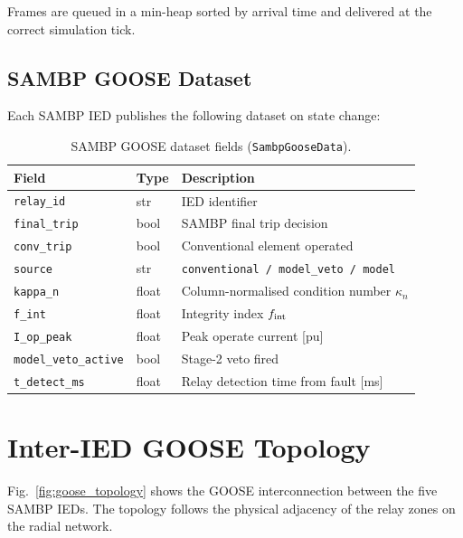 \documentclass[12pt,a4paper]{article}
\newcommand{\kn}{\kappa_n}
\newcommand{\fint}{f_{\rm int}}
\begin{document}
Frames are queued in a min-heap sorted by arrival time and delivered
at the correct simulation tick.

\subsection{SAMBP GOOSE Dataset}

Each SAMBP IED publishes the following dataset on state change:

\begin{table}[H]
  \centering
  \caption{SAMBP GOOSE dataset fields (\texttt{SambpGooseData}).}
  \label{tab:goose_dataset}
  \begin{tabular}{lll}
    \toprule
    Field & Type & Description \\
    \midrule
    \texttt{relay\_id}          & str   & IED identifier \\
    \texttt{final\_trip}        & bool  & SAMBP final trip decision \\
    \texttt{conv\_trip}         & bool  & Conventional element operated \\
    \texttt{source}             & str   & \texttt{conventional / model\_veto / model} \\
    \texttt{kappa\_n}           & float & Column-normalised condition number $\kn$ \\
    \texttt{f\_int}             & float & Integrity index $\fint$ \\
    \texttt{I\_op\_peak}        & float & Peak operate current [pu] \\
    \texttt{model\_veto\_active}& bool  & Stage-2 veto fired \\
    \texttt{t\_detect\_ms}      & float & Relay detection time from fault [ms] \\
    \bottomrule
  \end{tabular}
\end{table}

\section{Inter-IED GOOSE Topology}

Fig.~\ref{fig:goose_topology} shows the GOOSE interconnection between
the five SAMBP IEDs.  The topology follows the physical adjacency of
the relay zones on the radial network.
\end{document}
